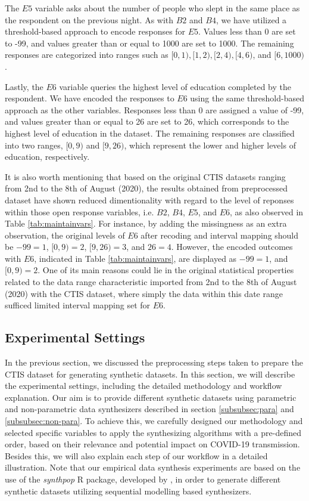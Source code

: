 The $E5$ variable asks about the number of people who slept in the same place as the respondent on the previous night. As with $B2$ and $B4$, we have utilized a threshold-based 
approach to encode responses for $E5$. Values less than 0 are set to -99, and values greater than or equal to 1000 are set to 1000. The remaining responses are categorized into ranges 
such as $[0,1), [1,2), [2,4), [4,6)$, and $[6,1000)$.

Lastly, the $E6$ variable queries the highest level of education completed by the respondent. We have encoded the responses to $E6$ using the same threshold-based approach as the 
other variables. Responses less than 0 are assigned a value of -99, and values greater than or equal to 26 are set to 26, which corresponds to the highest level of education in the dataset. 
The remaining responses are classified into two ranges, $[0,9)$ and $[9,26)$, which represent the lower and higher levels of education, respectively.

It is also worth mentioning that based on the original CTIS datasets ranging from 2nd to the 8th of August (2020), the results obtained from preprocessed dataset have shown reduced dimentionality with regard to the level of reponses within those open response variables, i.e. $B2$, $B4$, $E5$, and $E6$, as also observed in Table \ref{tab:maintainvars}. For instance, by adding the missingness as an extra observation, the original levels of $E6$ after recoding and interval mapping should be $-99=1$, $[0,9)=2$, $[9, 26)=3$, and $26=4$. However, the encoded outcomes with $E6$, indicated in Table \ref{tab:maintainvars}, are displayed as $-99=1$, and $[0,9)=2$. One of its main reasons could lie in the original statistical properties related to the data range characteristic imported from 2nd to the 8th of August (2020) with the CTIS dataset, where simply the data within this date range sufficed limited interval mapping set for $E6$.



\subsection{Experimental Settings}
\label{subsec:exp-settings}
In the previous section, we discussed the preprocessing steps taken to prepare the CTIS dataset for generating synthetic datasets. In this section, we will describe the experimental settings, including the detailed methodology and workflow explanation. Our aim is to provide different synthetic datasets using parametric and non-parametric data synthesizers described in section \ref{subsubsec:para} and \ref{subsubsec:non-para}. To achieve this, we carefully designed our methodology and selected specific variables to apply the synthesizing algorithms with a pre-defined order, based on their relevance and potential impact on COVID-19 transmission. Besides this, we will also explain each step of our workflow in a detailed illustration. Note that our empirical data synthesis experiments are based on the use of the \textit{synthpop} R package, developed by \citet{nowok2016synthpop}, in order to generate different synthetic datasets utilizing sequential modelling based synthesizers.

